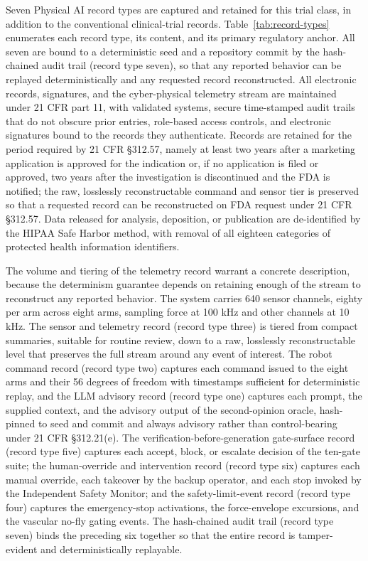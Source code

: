 Seven Physical AI record types are captured and retained for this trial class, in
addition to the conventional clinical-trial records. Table~\ref{tab:record-types}
enumerates each record type, its content, and its primary regulatory anchor. All
seven are bound to a deterministic seed and a repository commit by the hash-chained
audit trail (record type seven), so that any reported behavior can be replayed
deterministically and any requested record reconstructed. All electronic records,
signatures, and the cyber-physical telemetry stream are maintained under 21 CFR part
11, with validated systems, secure time-stamped audit trails that do not obscure
prior entries, role-based access controls, and electronic signatures bound to the
records they authenticate. Records are retained for the period required by 21 CFR
\S 312.57, namely at least two years after a marketing application is approved for
the indication or, if no application is filed or approved, two years after the
investigation is discontinued and the FDA is notified; the raw, losslessly
reconstructable command and sensor tier is preserved so that a requested record can
be reconstructed on FDA request under 21 CFR \S 312.57. Data released for analysis,
deposition, or publication are de-identified by the HIPAA Safe Harbor method, with
removal of all eighteen categories of protected health information identifiers.

The volume and tiering of the telemetry record warrant a concrete description,
because the determinism guarantee depends on retaining enough of the stream to
reconstruct any reported behavior. The system carries 640 sensor channels, eighty
per arm across eight arms, sampling force at 100 kHz and other channels at 10 kHz.
The sensor and telemetry record (record type three) is tiered from compact summaries,
suitable for routine review, down to a raw, losslessly reconstructable level that
preserves the full stream around any event of interest. The robot command record
(record type two) captures each command issued to the eight arms and their 56 degrees
of freedom with timestamps sufficient for deterministic replay, and the LLM advisory
record (record type one) captures each prompt, the supplied context, and the advisory
output of the second-opinion oracle, hash-pinned to seed and commit and always
advisory rather than control-bearing under 21 CFR \S 312.21(e). The
verification-before-generation gate-surface record (record type five) captures each
accept, block, or escalate decision of the ten-gate suite; the human-override and
intervention record (record type six) captures each manual override, each takeover by
the backup operator, and each stop invoked by the Independent Safety Monitor; and the
safety-limit-event record (record type four) captures the emergency-stop activations,
the force-envelope excursions, and the vascular no-fly gating events. The
hash-chained audit trail (record type seven) binds the preceding six together so that
the entire record is tamper-evident and deterministically replayable.

